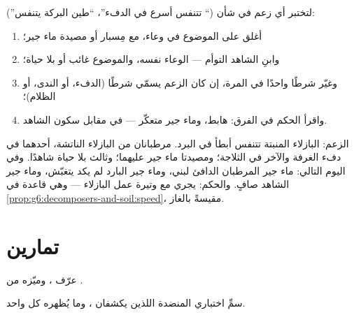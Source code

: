 \begin{method}\label{met:g7:what-is-respiration:test}
لتختبر أي زعم في شأن  (`` تتنفس أسرع في الدفء''،
``طين البركة يتنفس''):
\begin{enumerate}
  \item أغلق على الموضوع في وعاء، مع مِسبار  أو مصيدة ماء
        جير؛
  \item وابنِ الشاهد التوأم --- الوعاء نفسه، والموضوع غائب أو بلا
        حياة؛
  \item وغيّر شرطًا واحدًا في المرة، إن كان الزعم يسمّي شرطًا
        (الدفء، أو الندى، أو الظلام)؛
  \item واقرأ الحكم في الفرق:  هابط، وماء جير متعكّر ---
        في مقابل سكون الشاهد.
\end{enumerate}
\end{method}

\begin{example}\label{ex:g7:what-is-respiration:coldseed}
الزعم: البازلاء المنبتة تتنفس أبطأ في البرد. مرطبانان من البازلاء
الناتشة، أحدهما في دفء الغرفة والآخر في الثلاجة؛ ومصيدتا ماء جير
عليهما؛ وثالث بلا حياة شاهدًا. وفي اليوم التالي: ماء جير المرطبان
الدافئ لبني، وماء جير البارد لم يكد يتغبّش، وماء جير الشاهد صافٍ.
والحكم:  يجري مع وتيرة عمل البازلاء --- وهي قاعدة  في
\cref{prop:g6:decomposers-and-soil:speed}، مقيسةً بالغاز.
\end{example}

\section{تمارين}

\begin{exercise}[$\star$]\label{exo:g7:what-is-respiration:1}
عرّف ، وميّزه من .
\end{exercise}

\begin{exercise}[$\star$]\label{exo:g7:what-is-respiration:2}
سمِّ اختباري المنضدة اللذين يكشفان ، وما يُظهره كل واحد.
\end{exercise}

